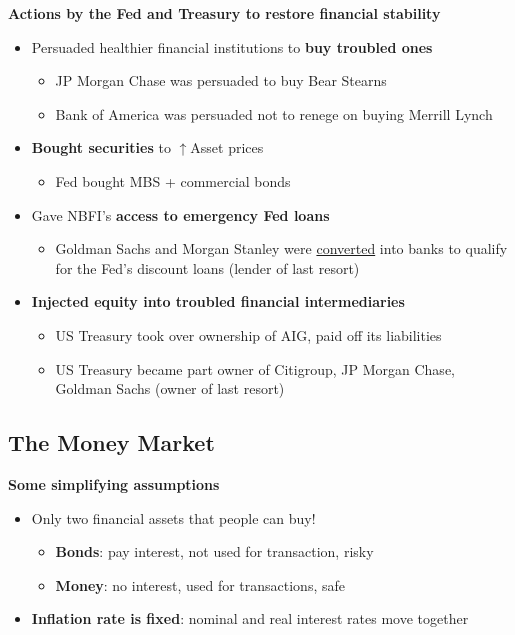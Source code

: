 \documentclass{article}
\begin{document}
\begin{multicols}{2}
\textbf{Actions by the Fed and Treasury to restore financial stability}
\begin{itemize}
	\item Persuaded healthier financial institutions to \textbf{buy troubled ones}
	\begin{itemize}
		\item JP Morgan Chase was persuaded to buy Bear Stearns
		\item Bank of America was persuaded not to renege on buying Merrill Lynch
	\end{itemize}
    \item \textbf{Bought securities} to $\uparrow$Asset prices
    \begin{itemize}
    	\item Fed bought MBS + commercial bonds
    \end{itemize}
    \item Gave NBFI's \textbf{access to emergency Fed loans}
    \begin{itemize}
    	\item Goldman Sachs and Morgan Stanley were \underline{converted} into banks to qualify for the Fed's discount loans (lender of last resort)
    \end{itemize}
    \item \textbf{Injected equity into troubled financial intermediaries}
    \begin{itemize}
    	\item US Treasury took over ownership of AIG, paid off its liabilities
    	\item US Treasury became part owner of Citigroup, JP Morgan Chase, Goldman Sachs (owner of last resort)
    \end{itemize}
\end{itemize}

\subsection{The Money Market}
\textbf{Some simplifying assumptions}
\begin{itemize}
	\item Only two financial assets that people can buy!
	\begin{itemize}
		\item \textbf{Bonds}: pay interest, not used for transaction, risky
		\item \textbf{Money}: no interest, used for transactions, safe
	\end{itemize}
    \item \textbf{Inflation rate is fixed}: nominal and real interest rates move together
\end{itemize}

\end{multicols}
\end{document}
